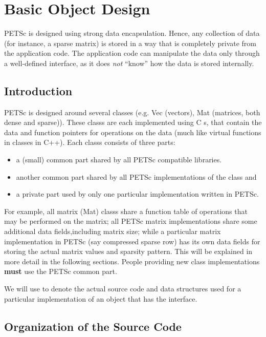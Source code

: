 \documentclass[twoside,12pt]{../sty/report_petsc}
\begin{document}
\chapter{Basic Object Design}
\label{chapter:design}


PETSc is designed using strong data encapsulation.  Hence,
any collection of data (for instance, a sparse matrix) is stored in
a way that is completely private from the application code. The application
code can manipulate the data only through a well-defined interface, as it
does {\em not} ``know'' how the data is stored internally.

\section{Introduction}

PETSc is designed around several classes (e.g. Vec (vectors),
Mat (matrices, both dense and sparse)). These classs are each
implemented using C s, that contain the data and function pointers
for operations on the data (much like virtual functions in classes in C++).
Each classs consists of three parts:
\begin{itemize}
\item a (small) common part shared by all PETSc compatible libraries.
\item another common part shared by all PETSc implementations of the class and
\item a private part used by only one particular implementation written in PETSc.
\end{itemize}
For example, all matrix (Mat) classs share a function table of operations that
may be performed on the matrix; all PETSc matrix implementations share some additional
data fields,including matrix size; while a particular matrix implementation in PETSc
(say compressed sparse row) has its own data fields for storing the actual
matrix values and sparsity pattern. This will be explained in more detail
in the following sections. People providing new class implementations {\bf must}
use the PETSc common part.


We will use  to denote the actual source code and
data structures used for a particular implementation of an object that has the
 interface.

\section{Organization of the Source Code}
\end{document}
